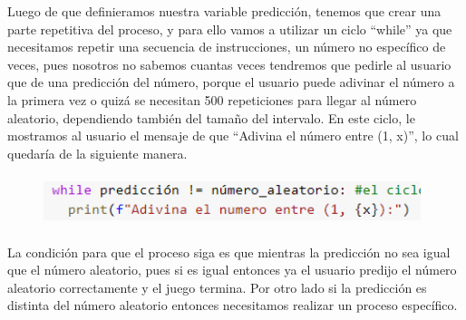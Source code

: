 \documentclass[a4paper,12pt]{article}
\begin{document}
\large{Luego de que definieramos nuestra variable predicción, tenemos que crear una parte repetitiva del proceso, y para ello vamos a utilizar un ciclo ``while'' ya que necesitamos repetir una secuencia de instrucciones, un número no específico de veces, pues nosotros no sabemos cuantas veces tendremos que pedirle al usuario que de una predicción del número, porque el usuario puede adivinar el número a la primera vez o quizá se necesitan 500 repeticiones para llegar al número aleatorio, dependiendo también del tamaño del intervalo. En este ciclo, le mostramos al usuario el mensaje de que ``Adivina el número entre (1, x)'', lo cual quedaría de la siguiente manera.}


\begin{figure}[H]
    \caption{}
    \centering \includegraphics[width=11cm, height=1.5cm]{a_10.png}
    \label{fig1:my_label}
\end{figure}

\large{La condición para que el proceso siga es que mientras la predicción no sea igual que el número aleatorio, pues si es igual entonces ya el usuario predijo el número aleatorio correctamente y el juego termina. Por otro lado si la predicción es distinta del número aleatorio entonces necesitamos realizar un proceso específico.}
\end{document}
